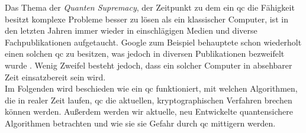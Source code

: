 Das Thema der \textit{Quanten Supremacy}, der Zeitpunkt zu dem ein \ac{qc} die Fähigkeit besitzt komplexe Probleme besser zu lösen als ein klassischer Computer, ist in den letzten Jahren immer wieder in einschlägigen Medien und diverse Fachpublikationen aufgetaucht. Google zum Beispiel behauptete schon wiederholt einen solchen \ac{qc} zu besitzen, was jedoch in diversen Publikationen bezweifelt wurde \cite{cho_ordinary_2022}. Wenig Zweifel besteht jedoch, dass ein solcher Computer in absehbarer Zeit einsatzbereit sein wird.\\ %
Im Folgenden wird beschieden wie ein \ac{qc} funktioniert, mit welchen Algorithmen, die in realer Zeit laufen, \ac{qc} die aktuellen, kryptographischen Verfahren brechen können werden. Außerdem werden wir aktuelle, neu Entwickelte quantensichere Algorithmen betrachten und wie sie sie Gefahr durch \ac{qc} mittigern werden.